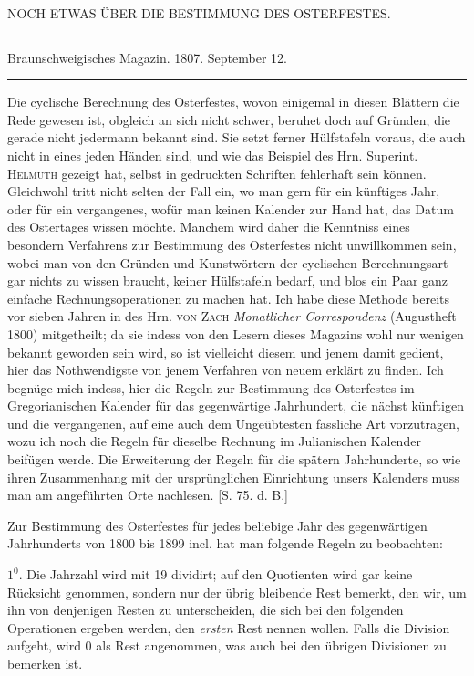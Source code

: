 \clearpage{}%
\begin{center}
{\large NOCH ETWAS ÜBER DIE BESTIMMUNG DES OSTERFESTES.\par}
\medskip\hrule\medskip
{\small Braunschweigisches Magazin. 1807. September 12.\par}
\medskip\hrule
\end{center}\medskip
Die cyclische Berechnung des Osterfestes, wovon einigemal in diesen Blättern
die Rede gewesen ist, obgleich an sich nicht schwer, beruhet doch auf Gründen,
die gerade nicht jedermann bekannt sind. Sie setzt ferner Hülfstafeln voraus,
die auch nicht in eines jeden Händen sind, und wie das Beispiel des Hrn.
Superint. \textsc{Helmuth} gezeigt hat, selbst in gedruckten Schriften fehlerhaft sein
können. Gleichwohl tritt nicht selten der Fall ein, wo man gern für ein künftiges
Jahr, oder für ein vergangenes, wofür man keinen Kalender zur Hand hat,
das Datum des Ostertages wissen möchte. Manchem wird daher die Kenntniss
eines besondern Verfahrens zur Bestimmung des Osterfestes nicht unwillkommen
sein, wobei man von den Gründen und Kunstwörtern der cyclischen Berechnungsart
gar nichts zu wissen braucht, keiner Hülfstafeln bedarf, und blos ein
Paar ganz einfache Rechnungsoperationen zu machen hat. Ich habe diese Methode
bereits vor sieben Jahren in des Hrn. \textsc{von Zach} \textit{Monatlicher Correspondenz}
(Augustheft 1800) mitgetheilt; da sie indess von den Lesern dieses Magazins wohl
nur wenigen bekannt geworden sein wird, so ist vielleicht diesem und jenem damit
gedient, hier das Nothwendigste von jenem Verfahren von neuem erklärt zu
finden. Ich begnüge mich indess, hier die Regeln zur Bestimmung des Osterfestes
im Gregorianischen Kalender für das gegenwärtige Jahrhundert, die nächst%
%
künftigen und die vergangenen, auf eine auch dem Ungeübtesten fassliche Art
vorzutragen, wozu ich noch die Regeln für dieselbe Rechnung im Julianischen
Kalender beifügen werde. Die Erweiterung der Regeln für die spätern Jahrhunderte,
so wie ihren Zusammenhang mit der ursprünglichen Einrichtung unsers
Kalenders muss man am angeführten Orte nachlesen. [S. 75. d. B.]

Zur Bestimmung des Osterfestes für jedes beliebige Jahr des gegenwärtigen
Jahrhunderts von 1800 bis 1899 incl. hat man folgende Regeln zu beobachten:

$1^{0}$. Die Jahrzahl wird mit 19 dividirt; auf den Quotienten wird gar keine
Rücksicht genommen, sondern nur der übrig bleibende Rest bemerkt, den wir,
um ihn von denjenigen Resten zu unterscheiden, die sich bei den folgenden Operationen
ergeben werden, den \textit{ersten} Rest nennen wollen. Falls die Division
aufgeht, wird 0 als Rest angenommen, was auch bei den übrigen Divisionen
zu bemerken ist.


